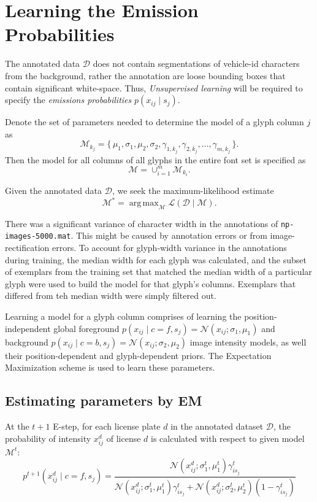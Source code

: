 \documentclass[a4paper,12pt]{article}
\newcommand{\lhood}{\ensuremath{\mathcal{L}}}
\newcommand{\truth}{\ensuremath{\mathcal{D}}}
\newcommand{\model}{\ensuremath{\mathcal{M}}}
\newcommand{\optmodel}{\ensuremath{\mathcal{M}^*}}
\DeclareMathOperator*{\argmax}{arg\,max}
\begin{document}
\section{Learning the Emission Probabilities}
The annotated data $\truth$ does not contain segmentations of
vehicle-id characters from the background, rather the annotation are
loose bounding boxes that contain significant white-space. Thus,
\emph{Unsupervised learning} will be required to specify the
\emph{emissions probabilities} $p(x_{ij} \mid s_j)$.

Denote the set of parameters needed to determine the model of a glyph
column $j$ as
\[\model_{k_j}=\{\,\mu_1,\sigma_1,\mu_2,\sigma_2,\gamma_{1,k_j},\gamma_{2,k_j},\ldots,\gamma_{m,k_j}\,\}.\]
Then the model for all columns of all glyphs in the entire font set is
specified as
\[
\model = \cup_{i=1}^m\model_{k_i}.
\]

Given the annotated data $\truth$, we seek the maximum-likelihood
estimate \[ \optmodel = \argmax_{\model} \lhood(\truth \mid \model).\]

There was a significant variance of character width in the annotations
of \texttt{np-images-5000.mat}. This might be caused by annotation
errors or from image-rectification errors. To account for glyph-width
variance in the annotations during training, the median width for each
glyph was calculated, and the subset of exemplars from the training
set that matched the median width of a particular glyph were used to
build the model for that glyph's columns. Exemplars that differed from
teh median width were simply filtered out.

Learning a model for a glyph column comprises of learning the
position-independent global foreground $ p(x_{ij}\mid
c=f,s_j)=\mathcal{N}(x_{ij};\sigma_1,\mu_1)$ and background $p(x_{ij}
\mid c=b,s_j)=\mathcal{N}(x_{ij};\sigma_2,\mu_2)$ image intensity
models, as well their position-dependent and glyph-dependent
priors. The Expectation Maximization scheme is used to learn these
parameters.

\subsection{Estimating parameters by EM}
At the $t+1$ E-step, for each license plate $d$ in the annotated
dataset \truth, the probability of intensity $x^d_{ij}$ of license $d$
is calculated with respect to given model $\model^t$:
\[
  p^{t+1}(x^d_{ij} \mid c=f, s_j) =
  \frac{\mathcal{N}(x^d_{ij};\sigma_1^t,\mu_1^t)\gamma_{is_j}^t}{\mathcal{N}(x^d_{ij};\sigma_1^t,\mu_1^t)\gamma_{is_j}^t+\mathcal{N}(x^d_{ij};\sigma_2^t,\mu_2^t)(1-\gamma_{is_j}^t)}
\]
\end{document}
